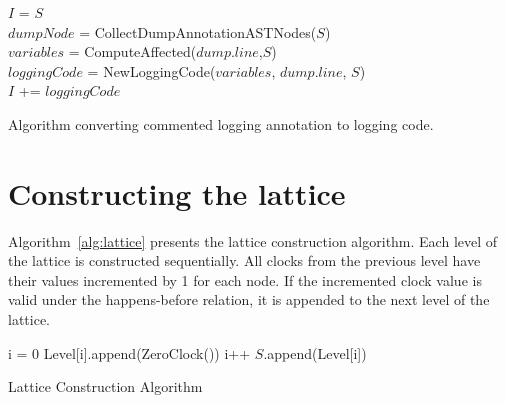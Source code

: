 \begin{algorithm}[t]

    $I$ = $S$ \\
    $dumpNode$ = CollectDumpAnnotationASTNodes($S$) \\
     {
        $variables$ = ComputeAffected($dump.line$,$S$)\\
        $loggingCode$ = NewLoggingCode($variables$, $dump.line$, $S$)\\
        $I$ += $loggingCode$\\
    }
    \caption{Algorithm converting commented logging annotation to logging code.}
    \label{alg:instrument}
\end{algorithm}



\section{Constructing the lattice}
\label{sec:lattice-appendix}

Algorithm~\ref{alg:lattice} presents the lattice construction
algorithm. Each level of the lattice is constructed sequentially.  All
clocks from the previous level have their values incremented by 1 for
each node. If the incremented clock value is valid under the
happens-before relation, it is appended to the next level of the
lattice.

\begin{algorithm}[t]

    i = 0 \;
    Level[i].append(ZeroClock())\;
     {
        i++\;
         {
        }
        $S$.append(Level[i])
    }
    \vspace{2mm}
    \caption{Lattice Construction Algorithm}
    \label{alg:lattice}
\end{algorithm}



